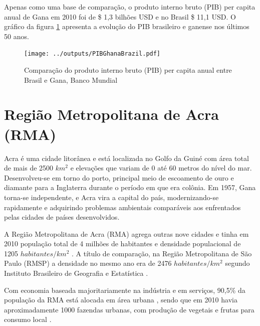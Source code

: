 Apenas como uma base de comparação, o produto interno bruto (PIB) per capita 
anual de Gana em 2010 foi de \$ 1,3 bilhões USD e no Brasil \$ 11,1 USD. 
O gráfico da figura \ref{fg:pib} apresenta a evolução do PIB brasileiro e 
ganense nos últimos 50 anos.

\begin{figure}[H]
  \centering
  \texttt{[image: ../outputs/PIBGhanaBrazil.pdf]}
  \caption{Comparação do produto interno bruto (PIB) per capita anual entre 
           Brasil e Gana, Banco Mundial \citeyearpar{bancomundial} 
          \label{fg:pib}}
\end{figure}


\newpage
\section{Região Metropolitana de Acra (RMA)}

Acra é uma cidade litorânea e está localizada no Golfo da Guiné com área total
de mais de  2500 $km^2$ e elevações que variam de 0 até 60 metros do nível do 
mar. Desenvolveu-se em torno do porto, principal meio de escoamento de ouro e 
diamante para a Inglaterra durante o período em que era colônia. 
Em 1957, Gana torna-se independente, e Acra vira a capital do país, 
modernizando-se rapidamente e adquirindo problemas ambientais comparáveis aos enfrentados pelas cidades de países desenvolvidos.

A Região Metropolitana de Acra (RMA) agrega outras nove cidades e tinha em 2010
população total de 4 milhões de habitantes e densidade populacional de 
1205 $habitantes/km^2$ \citep{ghanacensus2013}. 
A título de comparação, na Região Metropolitana de São 
Paulo (RMSP) a densidade no mesmo ano era de 2476 $habitantes/km^2$ 
segundo Instituto Brasileiro de Geografia e Estatística \citep{ibge2011}. 

Com economia baseada majoritariamente na indústria e em serviços, 90,5\% da 
população da RMA está alocada em área urbana \citep{ghanacensus2013}, sendo
que em 2010 havia aproximadamente 1000 fazendas urbanas, com produção de 
vegetais e frutas para consumo local \citep{lente2014}. 
 
